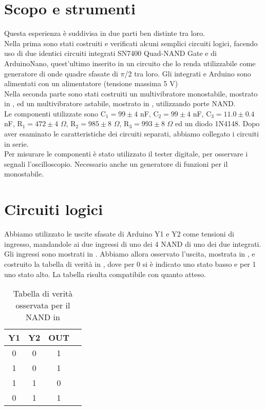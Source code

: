 \section{Scopo e strumenti}
Questa esperienza è suddivisa in due parti ben distinte tra loro.\\
Nella prima sono stati costruiti e verificati alcuni semplici circuiti logici, facendo uso di due identici circuiti integrati SN7400 Quad-NAND 
Gate e di ArduinoNano, quest'ultimo inserito in un circuito che lo renda utilizzabile come generatore di onde quadre sfasate di $\pi$/2 tra loro. Gli integrati e Arduino sono alimentati con un alimentatore (tensione massima 5 V)\\
Nella seconda parte sono stati costruiti un multivibratore monostabile, mostrato in , ed un multivibratore astabile, mostrato in , utilizzando porte NAND.\\ 
Le componenti utilizzate sono C$_1 = 99 \pm 4$ nF, C$_2 = 99 \pm 4$ nF, C$_3 = 11.0 \pm 0.4 $ nF, R$_1 = 472 \pm 4$ $\Omega$, R$_2 = 985 \pm 8$ $\Omega$, R$_3 = 993 \pm 8$ $\Omega$ ed un diodo 1N4148. Dopo aver esaminato le caratteristiche dei circuiti separati, abbiamo collegato i circuiti in serie.\\ 
Per misurare le componenti è stato utilizzato il tester digitale, per osservare i segnali l'oscilloscopio. Necessario anche un generatore di funzioni per il monostabile.

\section{Circuiti logici}
Abbiamo utilizzato le uscite sfasate di Arduino Y1 e Y2 come tensioni di ingresso, mandandole ai due ingressi di uno dei 4 NAND di uno dei due integrati. Gli ingressi sono mostrati in . Abbiamo allora osservato l'uscita, mostrata in , e costruito la tabella di verità in , dove per 0 si è indicato uno stato basso e per 1 uno stato alto. La tabella risulta compatibile con quanto atteso.\\

\begin{table}[h]
	\centering
	\begin{tabular}{*{4}{S[table-figures-exponent = 2]} }
		{Y1} & {Y2} & {OUT} \\
		 & 0 & 1\\
           1 & 0 & 1\\
           1 & 1 & 0\\
           0 & 1 & 1\\
 	\end{tabular}
	\caption{ Tabella di verità osservata per il NAND in  }
	\label{t:NAND}
\end{table}

